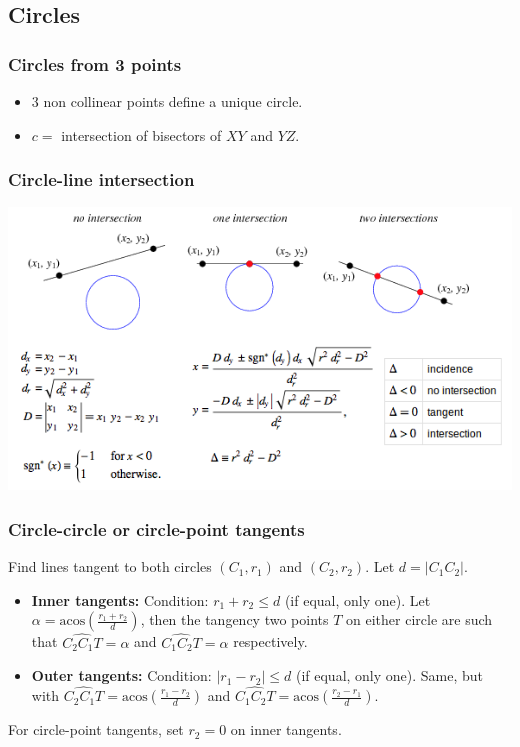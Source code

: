 \subsection{Circles}
\subsubsection{Circles from 3 points}
\begin{itemize}
\item $3$ non collinear points define a unique circle.
\item $c = $ intersection of bisectors of $XY$ and $YZ$. 
\end{itemize}

\subsubsection{Circle-line intersection}
\includegraphics[scale=0.5]{Geometrie/circleLine.png}

\subsubsection{Circle-circle or circle-point tangents}
\newcommand{\acos}{\mbox{acos}}
Find lines tangent to both circles $(C_1,r_1)$ and $(C_2,r_2)$. Let $d = |C_1C_2|$.
\begin{itemize}
\item{\bf Inner tangents:} Condition: $r_1+r_2 \leq d$ (if equal, only one). Let $\alpha = \acos(\frac{r_1+r_2}{d})$, then the tangency two points $T$ on either circle are such that $\widehat{C_2C_1T}=\alpha$ and $\widehat{C_1C_2T}=\alpha$ respectively.
\item{\bf Outer tangents:} Condition: $|r_1-r_2| \leq d$ (if equal, only one). Same, but with $\widehat{C_2C_1T}=\acos(\frac{r_1-r_2}{d})$ and $\widehat{C_1C_2T}=\acos(\frac{r_2-r_1}{d})$.
\end{itemize}
For circle-point tangents, set $r_2=0$ on inner tangents.
